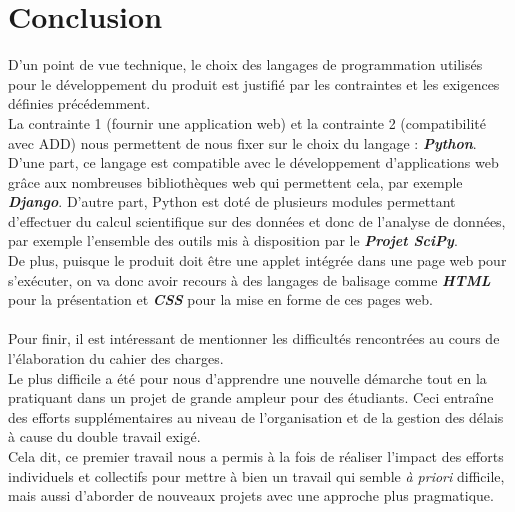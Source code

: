 	\section{Conclusion}
		D'un point de vue technique, le choix des langages de programmation utilisés pour le développement du produit est justifié par les contraintes et les exigences définies précédemment.\\
		La contrainte 1 (fournir une application web) et la contrainte 2 (compatibilité avec ADD) nous permettent de nous fixer sur le choix du langage : \textbf{\textit{Python}}.\\
		D'une part, ce langage est compatible avec le développement d'applications web grâce aux nombreuses bibliothèques web qui permettent cela, par exemple \textbf{\textit{Django}}. D'autre part, Python est doté de plusieurs modules permettant d'effectuer du calcul scientifique sur des données et donc de l'analyse de données, par exemple l'ensemble des outils mis à disposition par le \textbf{\textit{Projet SciPy}}.\\
		De plus, puisque le produit doit être une applet intégrée dans une page web pour s'exécuter, on va donc avoir recours à des langages de balisage comme \textbf{\textit{HTML}} pour la présentation et \textbf{\textit{CSS}} pour la mise en forme de ces pages web.
		
		\paragraph{} Pour finir, il est intéressant de mentionner les difficultés rencontrées au cours de l'élaboration du cahier des charges.\\
		Le plus difficile a été pour nous d'apprendre une nouvelle démarche tout en la pratiquant dans un projet de grande ampleur pour des étudiants. Ceci entraîne des efforts supplémentaires au niveau de l'organisation et de la gestion des délais à cause du double travail exigé.\\
		Cela dit, ce premier travail nous a permis à la fois de réaliser l'impact des efforts individuels et collectifs pour mettre à bien un travail qui semble \textit{à priori} difficile, mais aussi d'aborder de nouveaux projets avec une approche plus pragmatique.\\
	
